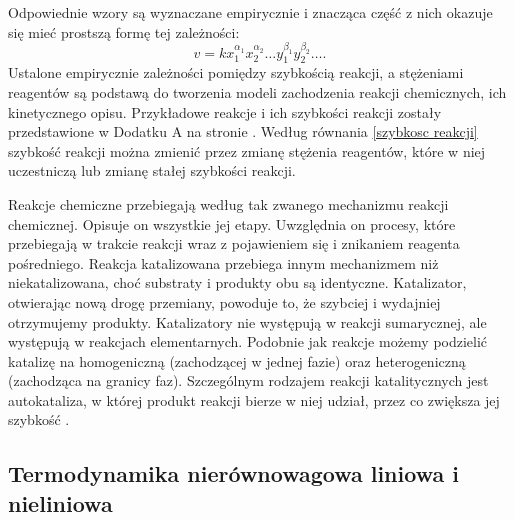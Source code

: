 \documentclass[10pt, a4paper, twoside, onecolumn]{article}
\numberwithin{equation}{section}
\begin{document}
	Odpowiednie wzory są wyznaczane empirycznie i znacząca część z nich okazuje się mieć prostszą formę tej zależności:
	\begin{equation}\label{szybkosc reakcji}
		v=k x_{1}^{\alpha_1}x_{2}^{\alpha_2}\ldots y_{1}^{\beta_1}y_{2}^{\beta_2}\ldots.
	\end{equation}
	Ustalone empirycznie zależności pomiędzy szybkością reakcji, a stężeniami reagentów są podstawą do tworzenia modeli zachodzenia reakcji chemicznych, ich kinetycznego opisu. Przykładowe reakcje i ich szybkości reakcji zostały przedstawione w Dodatku A na stronie \pageref{sec: dodatek A}. Według równania \eqref{szybkosc reakcji} szybkość reakcji można zmienić przez zmianę stężenia reagentów, które w niej uczestniczą lub zmianę stałej szybkości reakcji. \par 
	Reakcje chemiczne przebiegają według tak zwanego mechanizmu reakcji chemicznej. Opisuje on wszystkie jej etapy. Uwzględnia on procesy, które przebiegają w trakcie reakcji wraz z pojawieniem się i znikaniem reagenta pośredniego. Reakcja katalizowana przebiega innym mechanizmem niż niekatalizowana, choć substraty i produkty obu są identyczne. Katalizator, otwierając nową drogę przemiany, powoduje to, że szybciej i wydajniej otrzymujemy produkty. Katalizatory nie występują w reakcji sumarycznej, ale występują w reakcjach elementarnych. Podobnie jak reakcje możemy podzielić katalizę na homogeniczną (zachodzącej w jednej fazie) oraz heterogeniczną (zachodząca na granicy faz). Szczególnym rodzajem reakcji katalitycznych jest autokataliza, w której produkt reakcji bierze w niej udział, przez co zwiększa jej szybkość \cite{pigon1, atkins_por}. 
	
	\subsection{Termodynamika nierównowagowa liniowa i nieliniowa}
	
\end{document}

